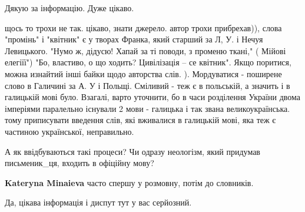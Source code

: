 \begin{itemize}
 
Дякую за інформацію. Дуже цікаво.

 

щось то трохи не так. цікаво, знати джерело. автор трохи прибрехав)), слова
"промінь" і "квітник" є у творах Франка, який старший за Л, У. і Нечуя
Левицького. "Нумо ж, дідусю! Хапай за ті поводи, з променю ткані," ( Мійові
елегіїї") "Бо, властиво, о що ходить? Цивілізація – се квітник". Якщо поритися,
можна изнайтий інші байки щодо авторства слів. ). Мордуватися - поширене слово
в Галичині за А. У і Польщі. Сміливий - теж є в польській, а значить і в
галицькій мові було. Взагалі, варто уточнити, бо в часи розділення України
двома імперіями паралельно існували 2 мови - галицька і так звана
великоукраїнська. тому приписувати введення слів, які вживалися в галицькій
мові, яка теж є частиною української, неправильно.


 
А як ввідбуваються такі процеси? Чи одразу неологізм, який придумав письменик\_ця, входить в офіційну мову?

\begin{itemize}
 
\textbf{Kateryna Minaieva} часто спершу у розмовну, потім до словників.
\end{itemize}

 
Да, цікава інформація і диспут тут у вас серйозний.

\end{itemize}

